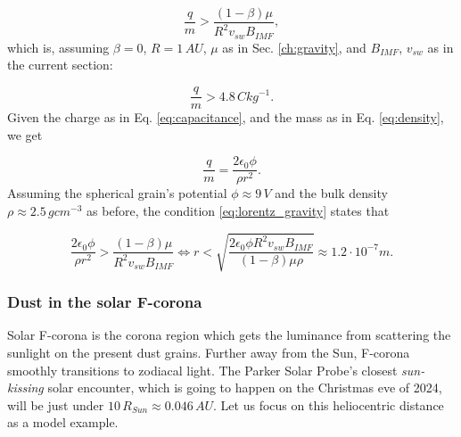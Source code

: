 \begin{equation}
    \frac{q}{m} > \frac{(1-\beta)\mu}{R^2 v_{sw} B_{IMF}},
    \label{eq:EM_estimate}
\end{equation}
which is, assuming $\beta = 0$, $R = 1 \, \si{AU}$, $\mu$ as in Sec. \ref{ch:gravity}, and $B_{IMF}$, $v_{sw}$ as in the current section:

\begin{equation}
    \frac{q}{m} >  4.8 \, \si{C kg^{-1}}.
\end{equation}
Given the charge as in Eq. \ref{eq:capacitance}, and the mass as in Eq. \ref{eq:density}, we get

\begin{equation}
    \frac{q}{m} = \frac{2 \epsilon_0 \phi}{\rho r^2}.
    \label{eq:charge_estimate}
\end{equation}
Assuming the spherical grain's potential $\phi \approx 9 \, \si{V}$ and the bulk density $\rho \approx 2.5 \, \si{g cm^{-3}}$ as before, the condition \ref{eq:lorentz_gravity} states that 

\begin{equation}
    \frac{2 \epsilon_0 \phi}{\rho r^2} > \frac{(1-\beta)\mu}{R^2 v_{sw} B_{IMF}} \Leftrightarrow 
    r < \sqrt{\frac{2 \epsilon_0 \phi R^2 v_{sw} B_{IMF}}{(1-\beta) \mu \rho}} \approx 
    1.2 \cdot 10^{-7} \si{m}.
    \label{eq:nanodust_size_estimate}
\end{equation}

\subsubsection{Dust in the solar F-corona}

Solar F-corona is the corona region which gets the luminance from scattering the sunlight on the present dust grains. Further away from the Sun, F-corona smoothly transitions to zodiacal light. The Parker Solar Probe's closest \textit{sun-kissing} solar encounter, which is going to happen on the Christmas eve of 2024, will be just under $10 \, R_{Sun} \approx 0.046 \, \si{AU}$. Let us focus on this heliocentric distance as a model example. 

